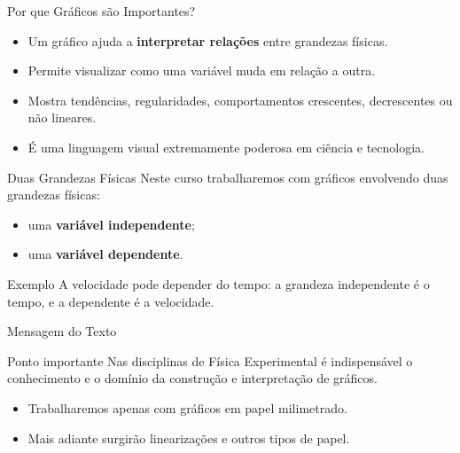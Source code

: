 \documentclass[aspectratio=169]{beamer}
\begin{document}
\begin{frame}{Por que Gráficos são Importantes?}
\begin{itemize}
\item Um gráfico ajuda a \textbf{interpretar relações} entre grandezas físicas.
\item Permite visualizar como uma variável muda em relação a outra.
\item Mostra tendências, regularidades, comportamentos crescentes, decrescentes ou não lineares.
\item É uma linguagem visual extremamente poderosa em ciência e tecnologia.
\end{itemize}
\end{frame}

\begin{frame}{Duas Grandezas Físicas}
Neste curso trabalharemos com gráficos envolvendo duas grandezas físicas:

\begin{itemize}
\item uma \textbf{variável independente};
\item uma \textbf{variável dependente}.
\end{itemize}

\bigskip

\begin{block}{Exemplo}
A velocidade pode depender do tempo: a grandeza independente é o tempo, e a dependente é a velocidade.
\end{block}
\end{frame}

\begin{frame}{Mensagem do Texto}
\begin{alertblock}{Ponto importante}
Nas disciplinas de Física Experimental é indispensável o conhecimento e o domínio da construção e interpretação de gráficos.
\end{alertblock}

\begin{itemize}
\item Trabalharemos apenas com gráficos em papel milimetrado.
\item Mais adiante surgirão linearizações e outros tipos de papel.
\end{itemize}
\end{frame}
\end{document}
